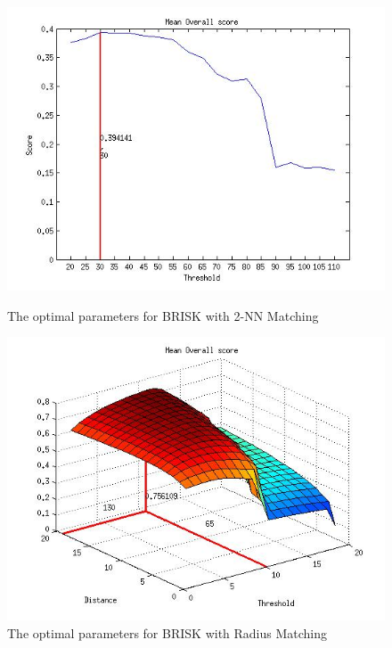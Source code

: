 \begin{figure}
\begin{minipage}[b]{0.5\linewidth}
\includegraphics[scale=0.4]{../Drawings/OptimalParameters_BRISK4_BRISK4_KNN.jpg}
\caption{The optimal parameters for BRISK with 2-NN Matching}
\label{fig:BRISKknnOptimal}
\end{minipage}
\begin{minipage}[b]{0.5\linewidth}
\includegraphics[scale=0.4]{../Drawings/OptimalParameters_BRISK4_BRISK4_Hamming.jpg}
\caption{The optimal parameters for BRISK with Radius Matching}
\label{fig:BRISKhammingOptimal}
\end{minipage}
\end{figure}

